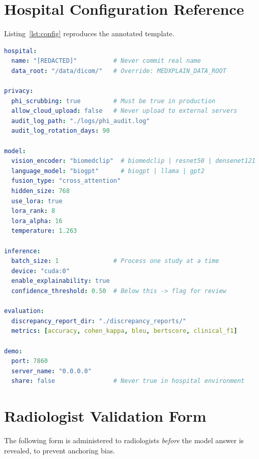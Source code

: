 \chapter{Hospital Configuration Reference}
\label{app:config}

Listing~\ref{lst:config} reproduces the annotated
 template.

\begin{lstlisting}[language=yaml,
                   caption={\code{config/hospital\_config.yaml} reference.},
                   label={lst:config}]
hospital:
  name: "[REDACTED]"          # Never commit real name
  data_root: "/data/dicom/"   # Override: MEDXPLAIN_DATA_ROOT

privacy:
  phi_scrubbing: true         # Must be true in production
  allow_cloud_upload: false   # Never upload to external servers
  audit_log_path: "./logs/phi_audit.log"
  audit_log_rotation_days: 90

model:
  vision_encoder: "biomedclip"  # biomedclip | resnet50 | densenet121
  language_model: "biogpt"      # biogpt | llama | gpt2
  fusion_type: "cross_attention"
  hidden_size: 768
  use_lora: true
  lora_rank: 8
  lora_alpha: 16
  temperature: 1.263

inference:
  batch_size: 1               # Process one study at a time
  device: "cuda:0"
  enable_explainability: true
  confidence_threshold: 0.50  # Below this -> flag for review

evaluation:
  discrepancy_report_dir: "./discrepancy_reports/"
  metrics: [accuracy, cohen_kappa, bleu, bertscore, clinical_f1]

demo:
  port: 7860
  server_name: "0.0.0.0"
  share: false                # Never true in hospital environment
\end{lstlisting}

\chapter{Radiologist Validation Form}
\label{app:form}

The following form is administered to radiologists \emph{before} the
model answer is revealed, to prevent anchoring bias.

\bigskip

